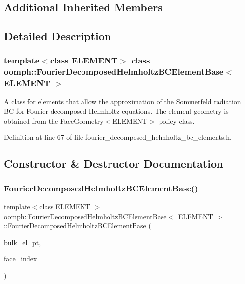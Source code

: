 \subsection*{Additional Inherited Members}


\subsection{Detailed Description}
\subsubsection*{template$<$class E\+L\+E\+M\+E\+NT$>$\newline
class oomph\+::\+Fourier\+Decomposed\+Helmholtz\+B\+C\+Element\+Base$<$ E\+L\+E\+M\+E\+N\+T $>$}

A class for elements that allow the approximation of the Sommerfeld radiation BC for Fourier decomposed Helmholtz equations. The element geometry is obtained from the Face\+Geometry$<$\+E\+L\+E\+M\+E\+N\+T$>$ policy class. 

Definition at line 67 of file fourier\+\_\+decomposed\+\_\+helmholtz\+\_\+bc\+\_\+elements.\+h.



\subsection{Constructor \& Destructor Documentation}
\mbox{\label{classoomph_1_1FourierDecomposedHelmholtzBCElementBase_accbd3c1c2b10fa12e9932af07913487f}} 
\subsubsection{\texorpdfstring{Fourier\+Decomposed\+Helmholtz\+B\+C\+Element\+Base()}{FourierDecomposedHelmholtzBCElementBase()}\hspace{0.1cm}{\footnotesize\ttfamily [1/3]}}
{\footnotesize\ttfamily template$<$class E\+L\+E\+M\+E\+NT $>$ \\
\hyperlink{classoomph_1_1FourierDecomposedHelmholtzBCElementBase}{oomph\+::\+Fourier\+Decomposed\+Helmholtz\+B\+C\+Element\+Base}$<$ E\+L\+E\+M\+E\+NT $>$\+::\hyperlink{classoomph_1_1FourierDecomposedHelmholtzBCElementBase}{Fourier\+Decomposed\+Helmholtz\+B\+C\+Element\+Base} (\begin{DoxyParamCaption}\item[{\hyperlink{classoomph_1_1FiniteElement}{Finite\+Element} $\ast$const \&}]{bulk\+\_\+el\+\_\+pt,  }\item[{const int \&}]{face\+\_\+index }\end{DoxyParamCaption})}



